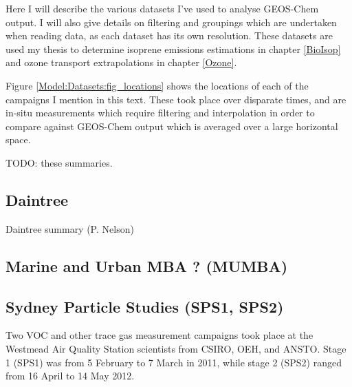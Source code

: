   Here I will describe the various datasets I've used to analyse GEOS-Chem output.
  I will also give details on filtering and groupings which are undertaken when reading data, as each dataset has its own resolution.
  These datasets are used my thesis to determine isoprene emissions estimations in chapter \ref{BioIsop} and ozone transport extrapolations in chapter \ref{Ozone}.
  
  Figure \ref{Model:Datasets:fig_locations} shows the locations of each of the campaigns I mention in this text.
  These took place over disparate times, and are in-situ measurements which require filtering and interpolation in order to compare against GEOS-Chem output which is averaged over a large horizontal space.
  
  
  TODO: these summaries.
  
  \subsection{Daintree}
    Daintree summary (P. Nelson)
  
  \subsection{Marine and Urban MBA ? (MUMBA)}
    \label{Model:Datasets:MUMBA}
  
  \subsection{Sydney Particle Studies (SPS1, SPS2)}
    \label{Model:Datasets:SPS}
    Two VOC and other trace gas measurement campaigns took place at the Westmead Air Quality Station scientists from CSIRO, OEH, and ANSTO. 
    Stage 1 (SPS1) was from 5 February to 7 March in 2011, while stage 2 (SPS2) ranged from 16 April to 14 May 2012.
    
